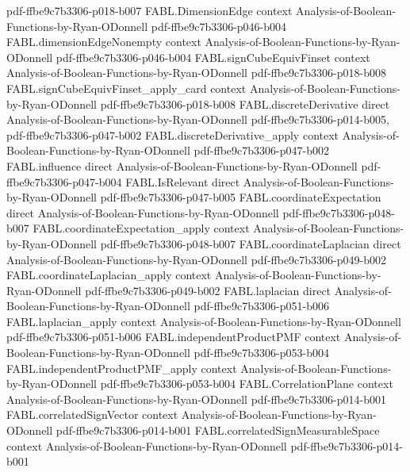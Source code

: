 \begin{theorem}
  {pdf-ffbe9c7b3306-p018-b007}
\proofstep
  {FABL.DimensionEdge}
  {context}
  {Analysis-of-Boolean-Functions-by-Ryan-ODonnell}
  {pdf-ffbe9c7b3306-p046-b004}
\proofstep
  {FABL.dimensionEdgeNonempty}
  {context}
  {Analysis-of-Boolean-Functions-by-Ryan-ODonnell}
  {pdf-ffbe9c7b3306-p046-b004}
\proofstep
  {FABL.signCubeEquivFinset}
  {context}
  {Analysis-of-Boolean-Functions-by-Ryan-ODonnell}
  {pdf-ffbe9c7b3306-p018-b008}
\proofstep
  {FABL.signCubeEquivFinset_apply_card}
  {context}
  {Analysis-of-Boolean-Functions-by-Ryan-ODonnell}
  {pdf-ffbe9c7b3306-p018-b008}
\proofstep
  {FABL.discreteDerivative}
  {direct}
  {Analysis-of-Boolean-Functions-by-Ryan-ODonnell}
  {pdf-ffbe9c7b3306-p014-b005,
    pdf-ffbe9c7b3306-p047-b002}
\proofstep
  {FABL.discreteDerivative_apply}
  {context}
  {Analysis-of-Boolean-Functions-by-Ryan-ODonnell}
  {pdf-ffbe9c7b3306-p047-b002}
\proofstep
  {FABL.influence}
  {direct}
  {Analysis-of-Boolean-Functions-by-Ryan-ODonnell}
  {pdf-ffbe9c7b3306-p047-b004}
\proofstep
  {FABL.IsRelevant}
  {direct}
  {Analysis-of-Boolean-Functions-by-Ryan-ODonnell}
  {pdf-ffbe9c7b3306-p047-b005}
\proofstep
  {FABL.coordinateExpectation}
  {direct}
  {Analysis-of-Boolean-Functions-by-Ryan-ODonnell}
  {pdf-ffbe9c7b3306-p048-b007}
\proofstep
  {FABL.coordinateExpectation_apply}
  {context}
  {Analysis-of-Boolean-Functions-by-Ryan-ODonnell}
  {pdf-ffbe9c7b3306-p048-b007}
\proofstep
  {FABL.coordinateLaplacian}
  {direct}
  {Analysis-of-Boolean-Functions-by-Ryan-ODonnell}
  {pdf-ffbe9c7b3306-p049-b002}
\proofstep
  {FABL.coordinateLaplacian_apply}
  {context}
  {Analysis-of-Boolean-Functions-by-Ryan-ODonnell}
  {pdf-ffbe9c7b3306-p049-b002}
\proofstep
  {FABL.laplacian}
  {direct}
  {Analysis-of-Boolean-Functions-by-Ryan-ODonnell}
  {pdf-ffbe9c7b3306-p051-b006}
\proofstep
  {FABL.laplacian_apply}
  {context}
  {Analysis-of-Boolean-Functions-by-Ryan-ODonnell}
  {pdf-ffbe9c7b3306-p051-b006}
\proofstep
  {FABL.independentProductPMF}
  {context}
  {Analysis-of-Boolean-Functions-by-Ryan-ODonnell}
  {pdf-ffbe9c7b3306-p053-b004}
\proofstep
  {FABL.independentProductPMF_apply}
  {context}
  {Analysis-of-Boolean-Functions-by-Ryan-ODonnell}
  {pdf-ffbe9c7b3306-p053-b004}
\proofstep
  {FABL.CorrelationPlane}
  {context}
  {Analysis-of-Boolean-Functions-by-Ryan-ODonnell}
  {pdf-ffbe9c7b3306-p014-b001}
\proofstep
  {FABL.correlatedSignVector}
  {context}
  {Analysis-of-Boolean-Functions-by-Ryan-ODonnell}
  {pdf-ffbe9c7b3306-p014-b001}
\proofstep
  {FABL.correlatedSignMeasurableSpace}
  {context}
  {Analysis-of-Boolean-Functions-by-Ryan-ODonnell}
  {pdf-ffbe9c7b3306-p014-b001}

\end{theorem}
